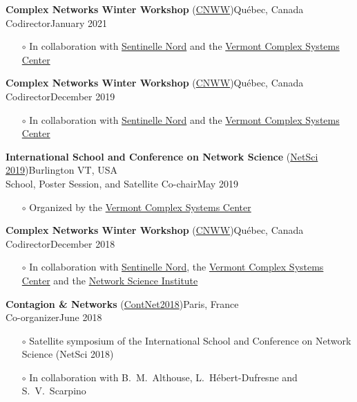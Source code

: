 \documentclass[11pt]{article}
\begin{document}
%
\parbox{\textwidth}{\textbf{Complex Networks Winter Workshop} (\href{https://sentinellenord.ulaval.ca/fr/reseauxcomplexes2020}{CNWW})\hfill Qu\'ebec, Canada\\
Codirector\hfill January 2021
\begin{itemize}[leftmargin=1.5em]\small
  \item[$\circ$] In collaboration with \href{http://sentinellenord.ulaval.ca/}{Sentinelle Nord} and the \href{http://www.vermontcomplexsystems.org/}{Vermont Complex Systems Center}
\end{itemize}}
%
\parbox{\textwidth}{\textbf{Complex Networks Winter Workshop} (\href{https://sentinellenord.ulaval.ca/fr/reseauxcomplexes2019}{CNWW})\hfill Qu\'ebec, Canada\\
Codirector\hfill December 2019
\begin{itemize}[leftmargin=1.5em]\small
  \item[$\circ$] In collaboration with \href{http://sentinellenord.ulaval.ca/}{Sentinelle Nord} and the \href{http://www.vermontcomplexsystems.org/}{Vermont Complex Systems Center}
\end{itemize}}
%
\parbox{\textwidth}{\textbf{International School and Conference on Network Science} (\href{http://vermontcomplexsystems.org/events/netsci/}{NetSci 2019})\hfill Burlington VT, USA\\
School, Poster Session, and Satellite Co-chair\hfill May 2019
\begin{itemize}[leftmargin=1.5em]\small
  \item[$\circ$] Organized by the \href{http://www.vermontcomplexsystems.org/}{Vermont Complex Systems Center}
\end{itemize}}
%
\parbox{\textwidth}{\textbf{Complex Networks Winter Workshop} (\href{https://sentinellenord.ulaval.ca/fr/reseauxcomplexes2018}{CNWW})\hfill Qu\'ebec, Canada\\
Codirector\hfill December 2018
\begin{itemize}[leftmargin=1.5em]\small
  \item[$\circ$] In collaboration with \href{http://sentinellenord.ulaval.ca/}{Sentinelle Nord}, the \href{http://www.vermontcomplexsystems.org/}{Vermont Complex Systems Center} and the \href{https://www.networkscienceinstitute.org/}{Network Science Institute}
\end{itemize}}
%
\parbox{\textwidth}{\textbf{Contagion \& Networks} (\href{http://networkscontagion.github.io/}{ContNet2018})\hfill Paris, France\\
Co-organizer\hfill June 2018
\begin{itemize}[leftmargin=1.5em]\small
  \item[$\circ$] Satellite symposium of the International School and Conference on Network Science (NetSci 2018)
  \item[$\circ$] In collaboration with B.~M.~Althouse, L.~H\'ebert-Dufresne and S.~V.~Scarpino
\end{itemize}}
\end{document}

